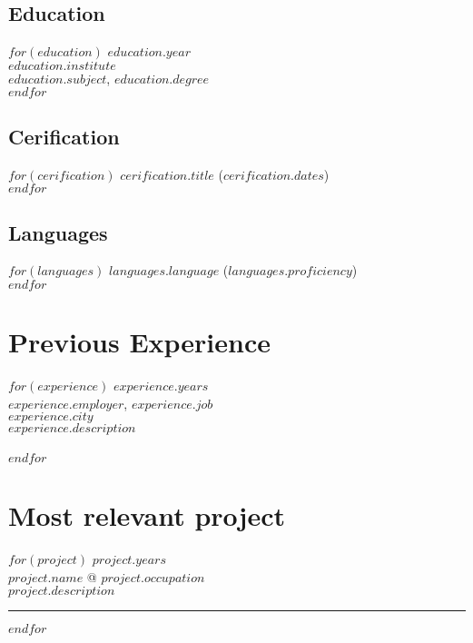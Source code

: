 \documentclass[$fontsize$, a4paper]{article}
\begin{document}
\begin{multicols}{2}

\subsection*{Education}
$for(education)$
\footnotesize{$education.year$}\\
\emph{$education.institute$}\\
\textbf{$education.subject$}, $education.degree$\\
$endfor$

\columnbreak

\subsection*{Cerification}
$for(cerification)$
\href{$cerification.url$}{$cerification.title$} ($cerification.dates$)\\
$endfor$

\vspace{-5pt}

\subsection*{Languages}
$for(languages)$
\emph{$languages.language$} ($languages.proficiency$)\\
$endfor$


\end{multicols}

\vspace{-10pt}



\section*{Previous Experience}
\noindent
$for(experience)$
\footnotesize{$experience.years$}\\
\textsc{$experience.employer$}, \emph{$experience.job$}\\
$experience.city$\\[.2cm]
$experience.description$\\\\
$endfor$

\pagebreak


\section*{Most relevant project}
\noindent
$for(project)$
\footnotesize{$project.years$}\\
\textbf{\textsc{$project.name$}} @ \emph{$project.occupation$}\\[.2cm]
$project.description$

\vspace{5pt}
\noindent\rule[0.5ex]{\linewidth}{1pt}

$endfor$
\end{document}
